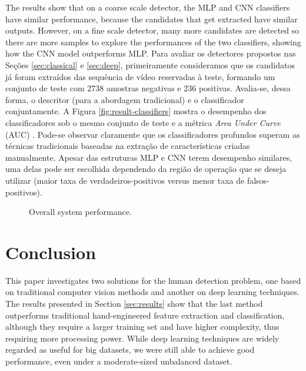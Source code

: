     The results show that on a coarse scale detector, the MLP and CNN classifiers have similar performance, because the candidates that get extracted have similar outputs. However, on a fine scale detector, many more candidates are detected so there are more samples to explore the performances of the two classifiers, showing how the CNN model outperforms MLP.
    Para avaliar os detectores propostos nas Seções \ref{sec:classical} e \ref{sec:deep}, primeiramente consideramos que os candidatos já foram extraídos das sequência de vídeo reservadas à teste, formando um conjunto de teste com 2738 amostras negativas e 236 positivas. Avalia-se, dessa forma, o descritor (para a abordagem tradicional) e o classificador conjuntamente. A Figura \ref{fig:result-classifiers} mostra o desempenho dos classificadores sob o mesmo conjunto de teste e a métrica \textit{Area Under Curve} (AUC) \cite{evaluationMetrics}. Pode-se observar claramente que os classificadores profundos superam as técnicas tradicionais baseadas na extração de características criadas manualmente. Apesar das estruturas MLP e CNN terem desempenho similares, uma delas pode ser escolhida dependendo da região de operação que se deseja utilizar (maior taxa de verdadeiros-positivos versus menor taxa de falsos-positivos).
    \begin{figure*}[!t]
    \vspace{-3ex}
    \centering
    \label{fig:result-system-all-zoom}
    \label{fig:result-system}
    \hfil
    \caption{Overall system performance.}
    \end{figure*}

\section{Conclusion}
\label{sec:conclusion}
    This paper investigates two solutions for the human detection problem, one based on traditional computer vision methods and another on deep learning techniques. The results presented in Section \ref{sec:results} show that the last method outperforms traditional hand-engineered feature extraction and classification, although they require a larger training set and have higher complexity, thus requiring more processing power. While deep learning techniques are widely regarded as useful for big datasets, we were still able to achieve good performance, even under a moderate-sized unbalanced dataset.

